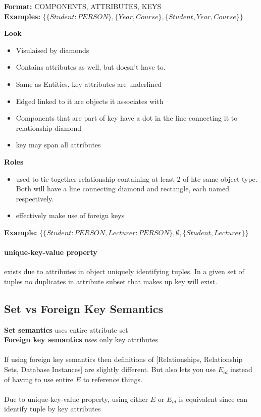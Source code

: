 \documentclass{article}
\newcommand\tab[1][0.5cm]{\hspace*{#1}}
\begin{document}
			\tab \textbf{Format:} {COMPONENTS, ATTRIBUTES, KEYS}
			\\ \tab \tab \textbf{Examples:} $\{\{Student:PERSON\},\{Year, Course\}, \{Student, Year, Course\}\}$

			\textbf{Look}
			\begin{itemize}
				\item Visulaised by diamonds
				\item Contains attributes as well, but doesn't have to.
				\item Same as Entities, key attributes are underlined
				\item Edged linked to it are objects it associates with
				\item Components that are part of key have a dot in the line connecting it to relationship diamond
				\item key may span all attributes
			\end{itemize}

			\textbf{Roles}
			\begin{itemize}
				\item used to tie together relationship containing at least 2 of hte same object type. Both will have a line connecting diamond and rectangle, each named respectively.
				\item effectively make use of foreign keys
			\end{itemize}
			\tab \textbf{Example:} $\{\{Student:PERSON, Lecturer:PERSON\},\emptyset, \{Student, Lecturer\}\}$

		\paragraph{unique-key-value property} exists due to attributes in object uniquely identifying tuples. In a given set of tuples no duplicates in attribute subset that makes up key will exist.

	\subsection{Set vs Foreign Key Semantics}
		\textbf{Set semantics} uses entire attribute set\\
		\textbf{Foreign key semantics} uses only key attributes
		\\\\If using foreign key semantics then definitions of [Relationships, Relationship Sets, Database Instances] are slightly different. But also lets you use $E_{id}$ instead of having to use entire $E$ to reference things.
		\\\\Due to unique-key-value property, using either $E$ or $E_{id}$ is equivalent since can identify tuple by key attributes
\end{document}
